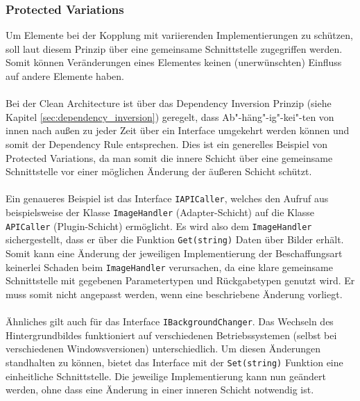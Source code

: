 \subsubsection{Protected Variations}
Um Elemente bei der Kopplung mit variierenden Implementierungen zu schützen, soll laut diesem Prinzip über eine gemeinsame Schnittstelle zugegriffen werden.
Somit können Veränderungen eines Elementes keinen (unerwünschten) Einfluss auf andere Elemente haben.\\
\\
Bei der Clean Architecture ist über das Dependency Inversion Prinzip (siehe Kapitel \ref{sec:dependency_inversion}) geregelt, dass Ab"-häng"-ig"-kei"-ten von innen nach außen zu jeder Zeit über ein Interface umgekehrt werden können und somit der Dependency Rule entsprechen.
Dies ist ein generelles Beispiel von Protected Variations, da man somit die innere Schicht über eine gemeinsame Schnittstelle vor einer möglichen Änderung der äußeren Schicht schützt.\\
\\
Ein genaueres Beispiel ist das Interface \texttt{IAPICaller}, welches den Aufruf aus beispielsweise der Klasse \texttt{ImageHandler} (Adapter-Schicht) auf die Klasse \texttt{APICaller} (Plugin-Schicht) ermöglicht.
Es wird also dem \texttt{ImageHandler} sichergestellt, dass er über die Funktion \texttt{Get(string)} Daten über Bilder erhält.
Somit kann eine Änderung der jeweiligen Implementierung der Beschaffungsart keinerlei Schaden beim \texttt{ImageHandler} verursachen, da eine klare gemeinsame Schnittstelle mit gegebenen Parametertypen und Rückgabetypen genutzt wird. Er muss somit nicht angepasst werden, wenn eine beschriebene Änderung vorliegt.\\
\\
Ähnliches gilt auch für das Interface \texttt{IBackgroundChanger}.
Das Wechseln des Hintergrundbildes funktioniert auf verschiedenen Betriebssystemen (selbst bei verschiedenen Windowsversionen) unterschiedlich. 
Um diesen Änderungen standhalten zu können, bietet das Interface mit der \texttt{Set(string)} Funktion eine einheitliche Schnittstelle.
Die jeweilige Implementierung kann nun geändert werden, ohne dass eine Änderung in einer inneren Schicht notwendig ist.
